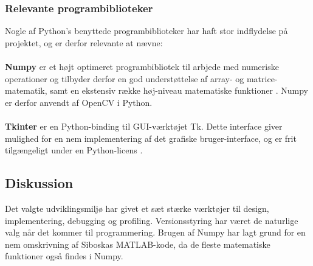 \documentclass[rapport.tex]{subfiles}
\begin{document}
	\subsubsection{Relevante programbiblioteker}
	\label{sec:relBib}
	Nogle af Python's benyttede programbiblioteker har haft stor indflydelse på projektet, og er derfor relevante at nævne: \\\\	
	\textbf{Numpy} er et højt optimeret programbibliotek til arbjede med numeriske operationer og tilbyder derfor en god understøttelse af array- og matrice-matematik, samt en ekstensiv række høj-niveau matematiske funktioner \cite{Numpy}. Numpy er derfor anvendt af OpenCV i Python. \\\\
	\textbf{Tkinter} er en Python-binding til GUI-værktøjet Tk. Dette interface giver mulighed for en nem implementering af det grafiske bruger-interface, og er frit tilgængeligt under en Python-licens \cite{Tkinter}.

	\subsection{Diskussion}
	Det valgte udviklingsmiljø har givet et sæt stærke værktøjer til design, implementering, debugging og profiling. Versionsstyring har været de naturlige valg når det kommer til programmering. 
	Brugen af Numpy har lagt grund for en nem omskrivning af Siboskas MATLAB-kode, da de fleste matematiske funktioner også findes i Numpy. 
		
\end{document}
